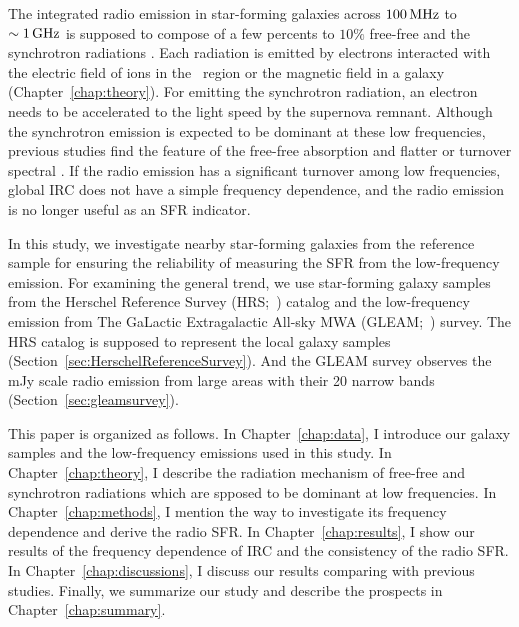 The integrated radio emission in star-forming galaxies across $100\,\mathrm{MHz}$ to $\sim 1\,\mathrm{GHz}$ is supposed to compose of a few percents to $10\%$ free-free and the synchrotron radiations \citep{Condon1992a}.
Each radiation is emitted by electrons interacted with the electric field of ions in the \ih~region or the magnetic field in a galaxy (Chapter~\ref{chap:theory}).
For emitting the synchrotron radiation, an electron needs to be accelerated to the light speed by the supernova remnant.
Although the synchrotron emission is expected to be dominant at these low frequencies, previous studies find the feature of the free-free absorption and flatter or turnover spectral \citep{Schober2017, Chyzy2018}.
If the radio emission has a significant turnover among low frequencies, global IRC does not have a simple frequency dependence, and the radio emission is no longer useful as an SFR indicator.

In this study, we investigate nearby star-forming galaxies from the reference sample for ensuring the reliability of measuring the SFR from the low-frequency emission.
For examining the general trend, we use star-forming galaxy samples from the Herschel Reference Survey (HRS;~\citealt{Boselli2010}) catalog and the low-frequency emission from The GaLactic Extragalactic All-sky MWA (GLEAM;~\citealt{Hurley-Walker2017a}) survey.
The HRS catalog is supposed to represent the local galaxy samples (Section~\ref{sec:HerschelReferenceSurvey}).
And the GLEAM survey observes the mJy scale radio emission from large areas with their 20 narrow bands (Section~\ref{sec:gleamsurvey}).

This paper is organized as follows.
In Chapter~\ref{chap:data}, I introduce our galaxy samples and the low-frequency emissions used in this study.
In Chapter~\ref{chap:theory}, I describe the radiation mechanism of free-free and synchrotron radiations which are spposed to be dominant at low frequencies.
In Chapter~\ref{chap:methods}, I mention the way to investigate its frequency dependence and derive the radio SFR\@.
In Chapter~\ref{chap:results}, I show our results of the frequency dependence of IRC and the consistency of the radio SFR\@.
In Chapter~\ref{chap:discussions}, I discuss our results comparing with previous studies.
Finally, we summarize our study and describe the prospects in Chapter~\ref{chap:summary}.



